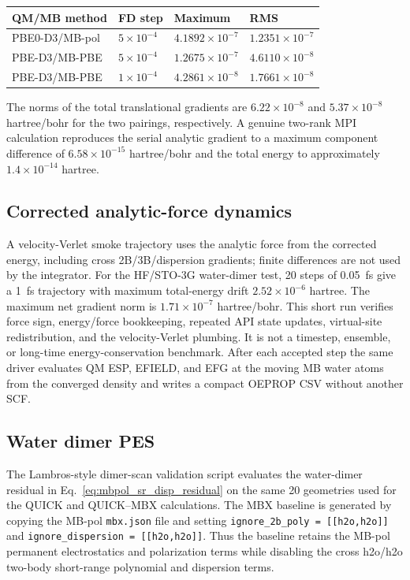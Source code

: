 \documentclass[11pt]{article}
\begin{document}
\begin{center}
\small
\begin{tabular}{llll}
\toprule
QM/MB method & FD step & Maximum & RMS \\
\midrule
PBE0-D3/MB-pol & $5\times10^{-4}$ &
$4.1892\times10^{-7}$ & $1.2351\times10^{-7}$ \\
PBE-D3/MB-PBE & $5\times10^{-4}$ &
$1.2675\times10^{-7}$ & $4.6110\times10^{-8}$ \\
PBE-D3/MB-PBE & $1\times10^{-4}$ &
$4.2861\times10^{-8}$ & $1.7661\times10^{-8}$ \\
\bottomrule
\end{tabular}
\end{center}

The norms of the total translational gradients are
$6.22\times10^{-8}$ and $5.37\times10^{-8}$ hartree/bohr for the two
pairings, respectively. A genuine two-rank MPI calculation reproduces
the serial analytic gradient to a maximum component difference of
$6.58\times10^{-15}$ hartree/bohr and the total energy to approximately
$1.4\times10^{-14}$ hartree.

\subsection{Corrected analytic-force dynamics}

A velocity-Verlet smoke trajectory uses the analytic force from the
corrected energy, including cross 2B/3B/dispersion gradients; finite
differences are not used by the integrator. For the HF/STO-3G water-dimer
test, 20 steps of 0.05~fs give a 1~fs trajectory with maximum total-energy
drift $2.52\times10^{-6}$ hartree. The maximum net gradient norm is
$1.71\times10^{-7}$ hartree/bohr. This short run verifies force sign,
energy/force bookkeeping, repeated API state updates, virtual-site
redistribution, and the velocity-Verlet plumbing. It is not a timestep,
ensemble, or long-time energy-conservation benchmark. After each accepted
step the same driver evaluates QM ESP, EFIELD, and EFG at the moving MB
water atoms from the converged density and writes a compact OEPROP CSV
without another SCF.

\subsection{Water dimer PES}

The Lambros-style dimer-scan validation script evaluates the water-dimer
residual in Eq.~\ref{eq:mbpol_sr_disp_residual} on the same 20 geometries
used for the QUICK and QUICK--MBX calculations. The MBX baseline is
generated by copying the MB-pol \texttt{mbx.json} file and setting
\texttt{ignore\_2b\_poly = [[h2o,h2o]]} and
\texttt{ignore\_dispersion = [[h2o,h2o]]}. Thus the baseline retains the
MB-pol permanent electrostatics and polarization terms while disabling the
cross h2o/h2o two-body short-range polynomial and dispersion terms.
\end{document}
